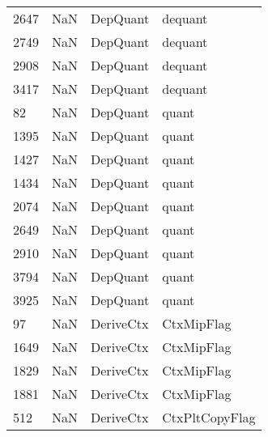 \begin{tabular}{llll}
2647 &                   NaN &                   DepQuant &                                   dequant \\
2749 &                   NaN &                   DepQuant &                                   dequant \\
2908 &                   NaN &                   DepQuant &                                   dequant \\
3417 &                   NaN &                   DepQuant &                                   dequant \\
82   &                   NaN &                   DepQuant &                                     quant \\
1395 &                   NaN &                   DepQuant &                                     quant \\
1427 &                   NaN &                   DepQuant &                                     quant \\
1434 &                   NaN &                   DepQuant &                                     quant \\
2074 &                   NaN &                   DepQuant &                                     quant \\
2649 &                   NaN &                   DepQuant &                                     quant \\
2910 &                   NaN &                   DepQuant &                                     quant \\
3794 &                   NaN &                   DepQuant &                                     quant \\
3925 &                   NaN &                   DepQuant &                                     quant \\
97   &                   NaN &                  DeriveCtx &                                CtxMipFlag \\
1649 &                   NaN &                  DeriveCtx &                                CtxMipFlag \\
1829 &                   NaN &                  DeriveCtx &                                CtxMipFlag \\
1881 &                   NaN &                  DeriveCtx &                                CtxMipFlag \\
512  &                   NaN &                  DeriveCtx &                            CtxPltCopyFlag \\

\end{tabular}

